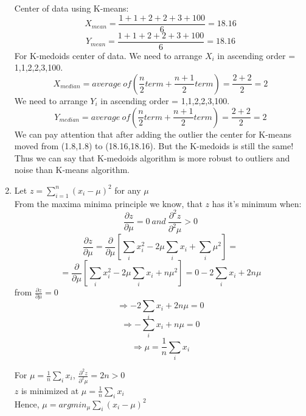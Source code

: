 \documentclass[12pt,a4paper]{article}
\begin{document}
\begin{enumerate}[label=(\alph*)]
Center of data using K-means:\\
$$
\displaystyle X_{mean} = \frac{1+1+2+2+3+100}{6} = 18.16 
$$
$$
\displaystyle Y_{mean} = \frac{1+1+2+2+3+100}{6} = 18.16  
$$
For K-medoids center of data. We need to arrange $X_i$ in ascending order = 1,1,2,2,3,100.\\
$$
\displaystyle X_{median} = average~ of (\frac{n}{2}term+\frac{n+1}{2}term) = \frac{2+2}{2}=2
$$ 
We need to arrange $Y_i$ in ascending order = 1,1,2,2,3,100.\\
$$
\displaystyle Y_{median} = average~ of (\frac{n}{2}term+\frac{n+1}{2}term) = \frac{2+2}{2}=2
$$ 
We can pay attention that after adding the outlier the center for K-means moved from (1.8,1.8) to (18.16,18.16). But the K-medoids is still the same! Thus we can say that K-medoids algorithm is more  robust to outliers and noise than K-means algorithm.

\item Let $z = \sum_{i=1}^{n}\left(x_i - \mu \right)^2  $ for any $\mu$\\
From the maxima minima principle we know, that $z$ has it's minimum when:
$$
\displaystyle \frac{\partial z}{\partial \mu} = 0 ~ and ~ \frac{\partial^2 z}{\partial^2 \mu} > 0
$$$$
\displaystyle \frac{\partial z}{\partial \mu} = \frac{\partial}{\partial \mu}\left[ \sum_i x_i^2 - 2\mu \sum_i x_i + \sum_i \mu^2 \right] = 
$$$$
\displaystyle =  \frac{\partial}{\partial \mu}\left[ \sum_i x_i^2 - 2\mu \sum_i x_i + n \mu^2 \right] = 0 - 2\sum_i x_i +2n\mu
$$
from $\frac{\partial z}{\partial \mu} = 0$
$$
\displaystyle \Longrightarrow  -2\sum_i x_i +2n\mu = 0
$$
$$
\displaystyle \Longrightarrow  -\sum_i x_i +n\mu = 0
$$
$$
\displaystyle \Longrightarrow  \mu =\frac{1}{n} \sum_i x_i 
$$

For $\mu =\frac{1}{n} \sum_i x_i $, $\frac{\partial^2 z}{\partial^2 \mu} = 2n > 0$\\[5pt]
$z$ is minimized at $\mu =\frac{1}{n} \sum_i x_i $\\[5pt]
Hence, $\mu =argmin_\mu\sum_i \left(x_i -\mu \right)^2$




\end{enumerate}
\end{document}
